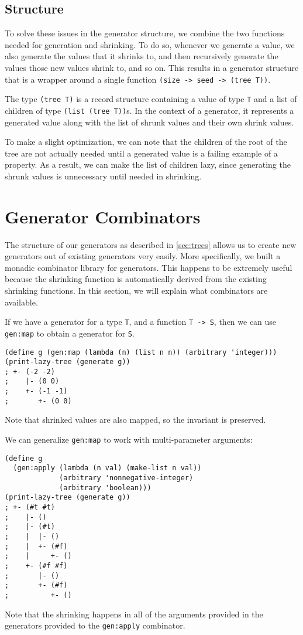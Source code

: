 \documentclass{scrartcl}
\begin{document}
\subsection{Structure}
To solve these issues in the generator structure,
we combine the two functions needed for generation and shrinking.
To do so, whenever we generate a value,
we also generate the values that it shrinks to,
and then recursively generate the values those new values shrink to, and so on.
This results in a generator structure that is a wrapper around a single
function \verb|(size -> seed -> (tree T))|.

The type \verb|(tree T)| is a record structure containing
  a value of type \verb|T| and
  a list of children of type \verb|(list (tree T))|s.
In the context of a generator, it represents
  a generated value
  along with the list of shrunk values and their own shrink values.

To make a slight optimization, we can note that the children of the root
of the tree are not actually needed until a generated value is
a failing example of a property.
As a result, we can make the list of children lazy,
since generating the shrunk values is unnecessary until needed in shrinking.


\section{Generator Combinators}

The structure of our generators as described in \ref{sec:trees} allows us to
create new generators out of existing generators very easily.
More specifically, we built a monadic combinator library for generators.
This happens to be extremely useful because the shrinking function is
automatically derived from the existing shrinking functions.
In this section, we will explain what combinators are available.

If we have a generator for a type \verb|T|, and a function \verb|T -> S|,
then we can use \verb|gen:map| to obtain a generator for \verb|S|.
\begin{verbatim}
(define g (gen:map (lambda (n) (list n n)) (arbitrary 'integer)))
(print-lazy-tree (generate g))
; +- (-2 -2)
;    |- (0 0)
;    +- (-1 -1)
;       +- (0 0)
\end{verbatim}
Note that shrinked values are also mapped, so the invariant is preserved.

We can generalize \verb|gen:map| to work with multi-parameter arguments:
\begin{verbatim}
(define g
  (gen:apply (lambda (n val) (make-list n val))
             (arbitrary 'nonnegative-integer)
             (arbitrary 'boolean)))
(print-lazy-tree (generate g))
; +- (#t #t)
;    |- ()
;    |- (#t)
;    |  |- ()
;    |  +- (#f)
;    |     +- ()
;    +- (#f #f)
;       |- ()
;       +- (#f)
;          +- ()
\end{verbatim}
Note that the shrinking happens in all of the arguments provided in the
generators provided to the \verb|gen:apply| combinator.
\end{document}
